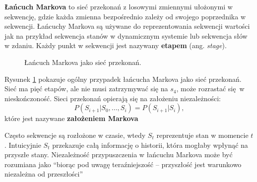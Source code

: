 \documentclass[a4paper, 12pt,twoside]{report}
\begin{document}
\textbf{Łańcuch Markova} to sieć przekonań z losowymi zmiennymi ułożonymi w
sekwencję, gdzie każda zmienna bezpośrednio zależy od swojego poprzednika w
sekwencji. Łańcuchy Markova są używane do reprezentowania sekwencji wartości
jak na przykład sekwencja stanów w dynamicznym systemie lub sekwencja słów w
zdaniu. Każdy punkt w sekwencji jest nazywany \textbf{etapem} (ang.
\textit{stage}).
\begin{figure}[!htb]
\begin{center}
\caption{Łańcuch Markova jako sieć przekonań.}
\label{markov_chain}
\end{center}
\end{figure}
Rysunek \ref{markov_chain} pokazuje ogólny przypadek łańcucha Markova jako sieć
przekonań. Sieć ma pięć etapów, ale nie musi zatrzymywać się na $s_4$, może
rozrastać się w nieskończoność. Sieci przekonań opierają się na założeniu
niezależności: \[P(S_{i+1} | S_0, \dots , S_i) = P(S_{i+1} | S_i),\]
które jest nazywane \textbf{założeniem Markova}

Często sekwencje są rozłożone w czasie, wtedy $S_t$ reprezentuje stan w
momencie $t$. Intuicyjnie $S_t$ przekazuje całą informację o historii, która
mogłaby wpłynąć na przyszłe stany. Niezależność przypuszczenia w łańcuchu
Markova może być rozumiana jako ``biorąc pod uwagę teraźniejszość -- przyszłość
jest warunkowo niezależna od przeszłości''
\end{document}
